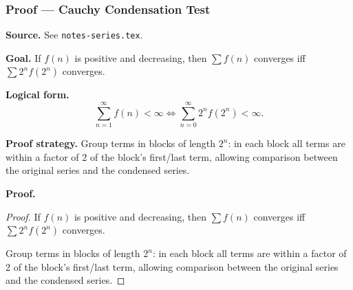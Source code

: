 

\clearpage
{}
\hypertarget{proof-RA-ABB-T-cauchy-condensation}{}

\subsubsection[Cauchy Condensation Test]{Proof --- Cauchy Condensation Test}

\bigskip

\noindent
\textbf{Source.}
See \texttt{notes-series.tex}.

\vspace{0.75em}

\noindent
\textbf{Goal.}
If $f(n)$ is positive and decreasing, then $\sum f(n)$ converges iff $\sum 2^n f(2^n)$ converges.

\vspace{0.75em}

\noindent
\textbf{Logical form.}
\[
  \sum_{n=1}^\infty f(n) < \infty \Longleftrightarrow \sum_{n=0}^\infty 2^n f(2^n) < \infty.
\]

\vspace{0.75em}

\noindent
\textbf{Proof strategy.}
Group terms in blocks of length $2^n$: in each block all terms are within a factor of 2 of the block's first/last term, allowing comparison between the original series and the condensed series.

\vspace{0.75em}

\noindent
\textbf{Proof.}
\begin{proof}
\Claim If $f(n)$ is positive and decreasing, then $\sum f(n)$ converges iff $\sum 2^n f(2^n)$ converges.

\Given 

\Goal 

\Strategy Group terms in blocks of length $2^n$: in each block all terms are within a factor of 2 of the block's first/last term, allowing comparison between the original series and the condensed series.

\medskip


\end{proof}

